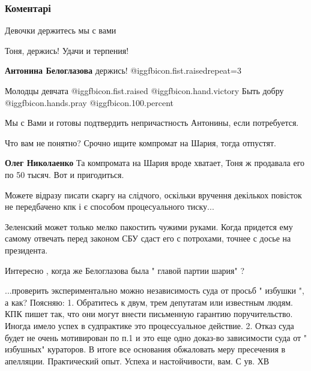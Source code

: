  
 
 
 
 
\subsubsection{Коментарі}

\begin{itemize} %
Девочки держитесь мы с вами

Тоня, держись! Удачи и терпения!

\textbf{Антонина Белоглазова} держись!  @igg{fbicon.fist.raised}{repeat=3} 

Молодцы девчата @igg{fbicon.fist.raised}  @igg{fbicon.hand.victory}
Быть добру  @igg{fbicon.hands.pray}  @igg{fbicon.100.percent} 

Мы с Вами и готовы подтвердить непричастность Антонины, если потребуется.

Что вам не понятно? Срочно ищите компромат на Шария, тогда отпустят.

\begin{itemize} %
\textbf{Олег Николаенко} Та компромата на Шария вроде хватает, Тоня ж продавала его по 50 тысяч. Вот и пригодиться.
\end{itemize} %

Можете відразу писати скаргу на слідчого, оскільки вручення декількох повісток не передбачено кпк і є способом процесуального тиску...

Зеленский может только мелко пакостить чужими руками. Когда придется ему самому отвечать перед законом СБУ сдаст его с потрохами, точнее с досье на президента.

Интересно , когда же Белоглазова была " главой партии шария" ?


...проверить экспериментально можно независимость суда от просьб " избушки ", а
как? Поясняю: 1. Обратитесь к двум, трем депутатам или известным людям. КПК
пишет так, что они могут внести письменную гарантию поручительство. Иногда
имело успех в судпрактике это процессуальное действие. 2. Отказ суда будет не
очень мотивирован по п.1 и это еще одно доказ-во зависимости суда от "
избушных" кураторов. В итоге все основания обжаловать меру пресечения в
апелляции. Практический опыт. Успеха и настойчивости, вам. С ув. ХВ


\end{itemize}
